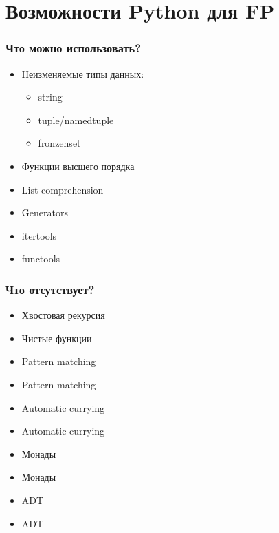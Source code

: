 \documentclass[18pt, compress, aspectratio=169]{beamer}
\def\fail{\textcolor{fail}{\FA \faRemove}}
\def\question{\textcolor{question}{\FA \faSearch}}
\begin{document}
\section{Возможности Python для FP}

\begin{frame}
    \frametitle{Что можно использовать?}
    \vspace{-25pt}
    \begin{itemize}[label={\MVRightarrow}]
        \item <+->Неизменяемые типы данных:
            \begin{itemize}
                \item string
                \item tuple/namedtuple
                \item fronzenset
            \end{itemize}
        \item <+->Функции высшего порядка
        \item <+->List comprehension
        \item <+->Generators
        \item <+->itertools
        \item <+->functools
    \end{itemize}
\end{frame}

\begin{frame}
    \frametitle{Что отсутствует?}
    \begin{overlayarea}{\textwidth}{.8\textheight}
    \begin{itemize}[label={\MVRightarrow}]
        \item <1->Хвостовая рекурсия \fail
        \item <2->Чистые функции \fail
        \item <3|only@3>Pattern matching \alt<3>{\fail}{\question}
        \item <4->Pattern matching \alt<3>{\fail}{\question}
        \item <5|only@5>Automatic currying \alt<5>{\fail}{\question}
        \item <6->Automatic currying \alt<5>{\fail}{\question}
        \item <7|only@7>Монады \alt<7>{\fail}{\question}
        \item <8->Монады \alt<7>{\fail}{\question}
        \item <9|only@9>ADT \alt<9>{\fail}{\question}
        \item <10->ADT \alt<9>{\fail}{\question}
    \end{itemize}
    \end{overlayarea}
\end{frame}
\end{document}
